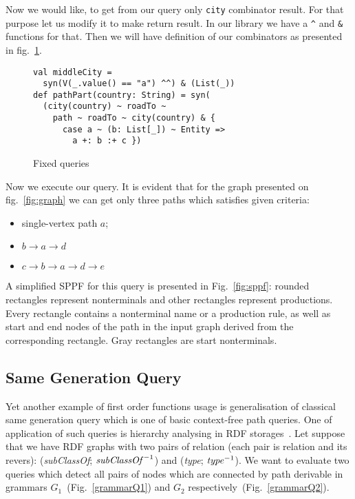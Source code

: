 Now we would like, to get from our query only \lstinline{city} combinator result. 
For that purpose let us modify it to make return result. 
In our library we have a \lstinline{^} and \lstinline{&} functions for that. 
Then we will have definition of our combinators as presented in fig.~\ref{fig:fixedPathQ}.

\begin{figure}[h]
\begin{lstlisting}
val middleCity = 
  syn(V(_.value() == "a") ^^) & (List(_))
def pathPart(country: String) = syn(
  (city(country) ~ roadTo ~ 
    path ~ roadTo ~ city(country) & {
      case a ~ (b: List[_]) ~ Entity => 
        a +: b :+ c })
\end{lstlisting}
\caption{Fixed queries}
\label{fig:fixedPathQ}
\end{figure}

Now we execute our query. It is evident that for the graph presented on fig.~\ref{fig:graph} we can get only three paths which satisfies given criteria:
\begin{itemize}
\item single-vertex path $a$;
\item $b \rightarrow a \rightarrow d$
\item $c \rightarrow b \rightarrow a \rightarrow d \rightarrow e$
\end{itemize}

A simplified SPPF for this query is presented in Fig.~\ref{fig:sppf}: rounded rectangles represent nonterminals and other rectangles represent productions. 
Every rectangle contains a nonterminal name or a production rule, as well as start and end nodes of the path in the input graph derived from the corresponding rectangle. 
Gray rectangles are start nonterminals.

\subsection{Same Generation Query}

Yet another example of first order functions usage is generalisation of classical same generation query which is one of basic context-free path queries.
One of application of such queries is hierarchy analysing in RDF storages~\cite{CFGonRDF}.
Let suppose that we have RDF graphs with two pairs of relation (each pair is relation and its revers): (\emph{subClassOf}; $\text{\emph{subClassOf}}^{-1}$) and (\emph{type}; $\text{\emph{type}}^{-1}$).
We want to evaluate two queries which detect all pairs of nodes which are connected by path derivable in grammars $G_1$~(Fig.~\ref{grammarQ1}) and $G_2$ respectively~(Fig.~\ref{grammarQ2}). 


